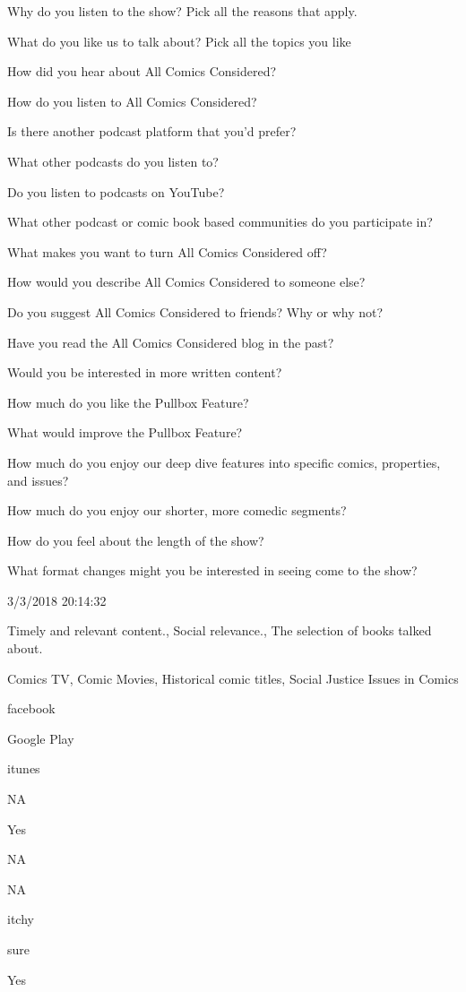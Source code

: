 \documentclass[]{article}
\begin{document}
Why do you listen to the show? Pick all the reasons that apply.

What do you like us to talk about? Pick all the topics you like

How did you hear about All Comics Considered?

How do you listen to All Comics Considered?

Is there another podcast platform that you'd prefer?

What other podcasts do you listen to?

Do you listen to podcasts on YouTube?

What other podcast or comic book based communities do you participate
in?

What makes you want to turn All Comics Considered off?

How would you describe All Comics Considered to someone else?

Do you suggest All Comics Considered to friends? Why or why not?

Have you read the All Comics Considered blog in the past?

Would you be interested in more written content?

How much do you like the Pullbox Feature?

What would improve the Pullbox Feature?

How much do you enjoy our deep dive features into specific comics,
properties, and issues?

How much do you enjoy our shorter, more comedic segments?

How do you feel about the length of the show?

What format changes might you be interested in seeing come to the show?

3/3/2018 20:14:32

Timely and relevant content., Social relevance., The selection of books
talked about.

Comics TV, Comic Movies, Historical comic titles, Social Justice Issues
in Comics

facebook

Google Play

itunes

NA

Yes

NA

NA

itchy

sure

Yes
\end{document}
